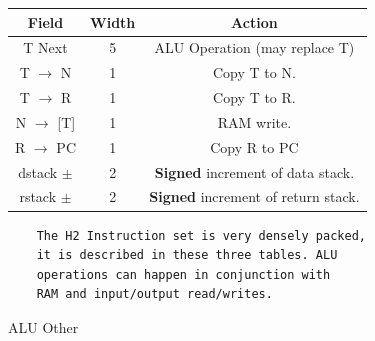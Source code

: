 \documentclass	[a4paper, 10pt]	{article}
\begin{document}
\begin{figure}[ht]
\begin{minipage}[t]{0.45\linewidth}
    \centering

    \begin{tabular}{|c|c|c|}
    \hline
    Field & Width & Action\\
    \hline
    T Next & 5 & ALU Operation (may replace T)\\
    \hline
    T $\to$ N & 1 & Copy T to N. \\
    \hline
    T $\to$ R & 1 & Copy T to R. \\
    \hline
    N $\to$ [T] & 1 & RAM write. \\
    \hline
    R $\to$ PC & 1 & Copy R to PC \\
    \hline
    dstack $\pm$ & 2 & \textbf{Signed} increment of data stack.\\
    \hline
    rstack $\pm$ & 2 & \textbf{Signed} increment of return stack.\\
    \hline

    \end{tabular}
    \caption{ALU Other}
    \label{fig:ALU instructions}

    \vspace{1cm}
\begin{verbatim}
    The H2 Instruction set is very densely packed, 
    it is described in these three tables. ALU
    operations can happen in conjunction with
    RAM and input/output read/writes.
\end{verbatim}

  \end{minipage}
\end{figure}
\FloatBarrier
\end{document}
